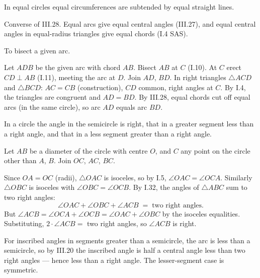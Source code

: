 \begin{claim}
\label{prop:III.29}
In equal circles equal circumferences are subtended by equal straight
lines.
\end{claim}
\begin{evidence}
\label{ev:III.29}
Converse of III.28.  Equal arcs give equal central angles (III.27),
and equal central angles in equal-radius triangles give equal
chords (I.4 SAS).
\end{evidence}

\begin{claim}
\label{prop:III.30}
To bisect a given arc.
\end{claim}
\begin{evidence}
\label{ev:III.30}
Let $ADB$ be the given arc with chord $AB$.  Bisect $AB$ at $C$
(I.10).  At $C$ erect $CD \perp AB$ (I.11), meeting the arc at $D$.
Join $AD$, $BD$.  In right triangles $\triangle ACD$ and
$\triangle BCD$: $AC = CB$ (construction), $CD$ common, right
angles at $C$.  By I.4, the triangles are congruent and $AD = BD$.
By III.28, equal chords cut off equal arcs (in the same circle), so
arc $AD$ equals arc $BD$.
\end{evidence}

\begin{claim}
\label{prop:III.31}
In a circle the angle in the semicircle is right, that in a greater
segment less than a right angle, and that in a less segment greater
than a right angle.
\end{claim}
\begin{evidence}
\label{ev:III.31}

Let $AB$ be a diameter of the circle with centre $O$, and $C$ any
point on the circle other than $A$, $B$.  Join $OC$, $AC$, $BC$.

Since $OA = OC$ (radii), $\triangle OAC$ is isoceles, so by I.5,
$\angle OAC = \angle OCA$.  Similarly $\triangle OBC$ is isoceles
with $\angle OBC = \angle OCB$.  By I.32, the angles of
$\triangle ABC$ sum to two right angles:
\[
    \angle OAC + \angle OBC + \angle ACB \;=\; \text{two right angles.}
\]
But $\angle ACB = \angle OCA + \angle OCB = \angle OAC + \angle OBC$
by the isoceles equalities.  Substituting, $2\cdot\angle ACB = $
two right angles, so $\angle ACB$ is right.

For inscribed angles in segments greater than a semicircle, the
arc is less than a semicircle, so by III.20 the inscribed angle is
half a central angle less than two right angles --- hence less than
a right angle.  The lesser-segment case is symmetric.
\end{evidence}

